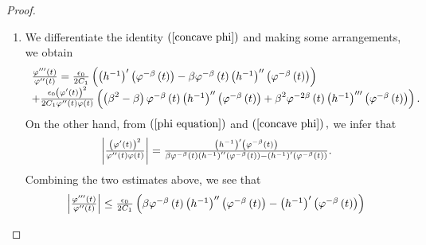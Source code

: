 \documentclass[11pt,reqno]{amsart}
\theoremstyle{plain}
\numberwithin{equation}{section}
\numberwithin{equation}{section}
\begin{document}
\begin{proof}
\begin{enumerate}
\item We differentiate the identity $\left( \ref{concave phi}\right) $ and
making some arrangements, we obtain%
\begin{equation*}
\begin{array}{l}
\frac{\varphi ^{\prime \prime \prime }\left( t\right) }{\varphi ^{\prime
\prime }\left( t\right) }=\frac{\epsilon _{0}}{2C_{1}}\left( \left(
h^{-1}\right) ^{\prime }\left( \varphi ^{-\beta }\left( t\right) \right)
-\beta \varphi ^{-\beta }\left( t\right) \left( h^{-1}\right) ^{\prime
\prime }\left( \varphi ^{-\beta }\left( t\right) \right) \right) \\ 
+\frac{\epsilon _{0}\left( \varphi ^{\prime }\left( t\right) \right) ^{2}}{%
2C_{1}\varphi ^{\prime \prime }\left( t\right) \varphi \left( t\right) }%
\left( \left( \beta ^{2}-\beta \right) \varphi ^{-\beta }\left( t\right)
\left( h^{-1}\right) ^{\prime \prime }\left( \varphi ^{-\beta }\left(
t\right) \right) +\beta ^{2}\varphi ^{-2\beta }\left( t\right) \left(
h^{-1}\right) ^{\prime \prime \prime }\left( \varphi ^{-\beta }\left(
t\right) \right) \right) .%
\end{array}%
\end{equation*}%
On the other hand, from $\left( \ref{phi equation}\right) $ and $\left( \ref%
{concave phi}\right) ,$ we infer that%
\begin{equation*}
\begin{array}{c}
\left\vert \frac{\left( \varphi ^{\prime }\left( t\right) \right) ^{2}}{%
\varphi ^{\prime \prime }\left( t\right) \varphi \left( t\right) }%
\right\vert =\frac{\left( h^{-1}\right) ^{\prime }\left( \varphi ^{-\beta
}\left( t\right) \right) }{\beta \varphi ^{-\beta }\left( t\right) \left(
h^{-1}\right) ^{\prime \prime }\left( \varphi ^{-\beta }\left( t\right)
\right) -\left( h^{-1}\right) ^{\prime }\left( \varphi ^{-\beta }\left(
t\right) \right) }.%
\end{array}%
\end{equation*}%
Combining the two estimates above, we see that%
\begin{equation*}
\begin{array}{l}
\left\vert \frac{\varphi ^{\prime \prime \prime }\left( t\right) }{\varphi
^{\prime \prime }\left( t\right) }\right\vert \leq \frac{\epsilon _{0}}{%
2C_{1}}\left( \beta \varphi ^{-\beta }\left( t\right) \left( h^{-1}\right)
^{\prime \prime }\left( \varphi ^{-\beta }\left( t\right) \right) -\left(
h^{-1}\right) ^{\prime }\left( \varphi ^{-\beta }\left( t\right) \right)
\right) \\ 

\end{array}
\end{equation*}
\end{enumerate}
\end{proof}
\end{document}
